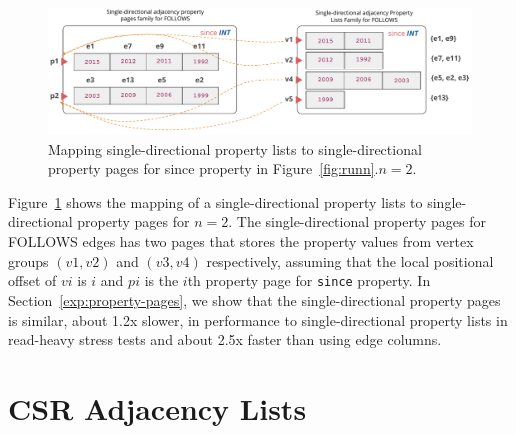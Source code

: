 \begin{figure}
	\hfill\includegraphics[scale=0.78]{img/paged}\hspace*{\fill}
	\captionsetup{justification=centering}
	\caption{Mapping single-directional property lists to single-directional property pages for since property in Figure~\ref{fig:runn}.$n=2$.}
	\label{fig:paged}
\end{figure}


Figure~\ref{fig:paged} shows the mapping of a single-directional property lists to single-directional  property pages for $n=2$. The single-directional property pages for FOLLOWS edges has two pages that stores the property values from vertex groups $(v1,v2)$ and $(v3,v4)$ respectively, assuming that the local positional offset of $vi$ is $i$ and $pi$ is the $i$th property page for \texttt{since} property. 
In Section~\ref{exp:property-pages}, we show that the single-directional  property pages is similar, about 1.2x slower, in performance to single-directional property lists in read-heavy stress tests and about 2.5x faster than using edge columns. 

\section{CSR Adjacency Lists}
\label{sec:adjacency-lists}

